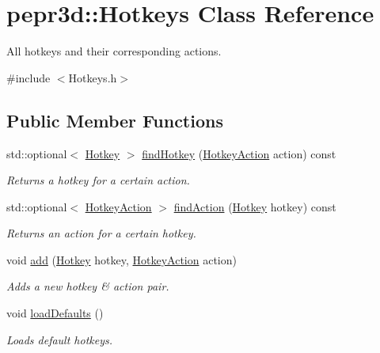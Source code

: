 \hypertarget{classpepr3d_1_1_hotkeys}{}\section{pepr3d\+::Hotkeys Class Reference}
\label{classpepr3d_1_1_hotkeys}


All hotkeys and their corresponding actions.  




{\ttfamily \#include $<$Hotkeys.\+h$>$}

\subsection*{Public Member Functions}
\begin{DoxyCompactItemize}
\item 
\mbox{\label{classpepr3d_1_1_hotkeys_af57c6eb43b445e2f94f5777c216186d7}} 
std\+::optional$<$ \mbox{\hyperlink{structpepr3d_1_1_hotkey}{Hotkey}} $>$ \mbox{\hyperlink{classpepr3d_1_1_hotkeys_af57c6eb43b445e2f94f5777c216186d7}{find\+Hotkey}} (\mbox{\hyperlink{namespacepepr3d_ae35d8dfd4e5925d633f100eb9b525cbe}{Hotkey\+Action}} action) const
\begin{DoxyCompactList}\small\item\em Returns a hotkey for a certain action. \end{DoxyCompactList}\item 
\mbox{\label{classpepr3d_1_1_hotkeys_ade71a2e93bb0ad6f9e5fe9898be16cf5}} 
std\+::optional$<$ \mbox{\hyperlink{namespacepepr3d_ae35d8dfd4e5925d633f100eb9b525cbe}{Hotkey\+Action}} $>$ \mbox{\hyperlink{classpepr3d_1_1_hotkeys_ade71a2e93bb0ad6f9e5fe9898be16cf5}{find\+Action}} (\mbox{\hyperlink{structpepr3d_1_1_hotkey}{Hotkey}} hotkey) const
\begin{DoxyCompactList}\small\item\em Returns an action for a certain hotkey. \end{DoxyCompactList}\item 
\mbox{\label{classpepr3d_1_1_hotkeys_a841a7666ac1997ef11756d284e427dfd}} 
void \mbox{\hyperlink{classpepr3d_1_1_hotkeys_a841a7666ac1997ef11756d284e427dfd}{add}} (\mbox{\hyperlink{structpepr3d_1_1_hotkey}{Hotkey}} hotkey, \mbox{\hyperlink{namespacepepr3d_ae35d8dfd4e5925d633f100eb9b525cbe}{Hotkey\+Action}} action)
\begin{DoxyCompactList}\small\item\em Adds a new hotkey \& action pair. \end{DoxyCompactList}\item 
\mbox{\label{classpepr3d_1_1_hotkeys_ab708b1e552b5adc73e05aa4284c0651c}} 
void \mbox{\hyperlink{classpepr3d_1_1_hotkeys_ab708b1e552b5adc73e05aa4284c0651c}{load\+Defaults}} ()
\begin{DoxyCompactList}\small\item\em Loads default hotkeys. \end{DoxyCompactList}\end{DoxyCompactItemize}
